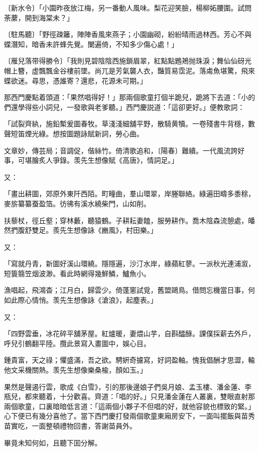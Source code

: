 \begin{myquote}
{\markfont〔新水令〕}「小園昨夜放江梅，另一番動人風味。梨花迎笑臉，楊柳妬腰圍。試問荼䕷，開到海棠未？」

{\markfont〔駐馬聽〕}「野徑疎籬，陣陣香風來燕子；小園幽砌，紛紛晴雨過林西。芳心不與蝶潛知，暗香未許蜂先覺。闌遍倚，不知多少傷心處！」

{\markfont〔雁兒落带得勝令〕}「我則見碧陰陰西施鎖眉翠，紅點點鶗鴂抛珠淚；舞仙仙砑光帽上簪，虚飄飄金谷樓前墜。尚兀是芳氣襲人衣，豔質易霑泥。落䖏魚堪驚，飛來蝶欲迷。尋思，憑誰寄？還悲，花源未可期。」
\end{myquote}

那西門慶點着頭道：「果然唱得好！」那兩個歌童打個半跪兒，跪將下去道：「小的們還學得些小詞兒，一發歌與老爹聽。」西門慶説道：「這卻更好。」便教歌詞：

\begin{myquote}
「試裂齊紈，施鉛槧爰圖春牧。草淺淺細舖平野，散騎黄犢。一卷殘書牛背穩，數聲短笛煙光綠。想按圖題詠賦新詞，勞心曲。

文章妙，傳芸局；音調促，偕絲竹。倚清歌追和，〔陽春〕難續。一代風流誇好事，可堪膾炙人爭錄。羡先生想像賦《高唐》，情詞足。」
\end{myquote}

又：

\begin{myquote}
「畫出耕圖，郊原外東阡西陌。町疃曲，羣山環翠，岸塍聯絡。綠遍田疇多黍稌，麥旂纂纂蚕盈箔。彷彿有溪水繞柴門，山如削。

扶藜杖，徑丘壑；穿林藪，聽猿鶴。子耕耘妻饁，服勞耕作。喬木陰森流憩處，皤然捫腹舒雙足。羨先生想像詠《豳風》，村田樂。」
\end{myquote}

又：

\begin{myquote}
「寫就丹青，新圖好溪山環繞。隱隱遍，沙汀水岸，綠蘋紅蓼。一派秋光連浦溆，短簑篛笠烟波渺。看此時網得幾鮮鱗，鱸魚小。

漁唱起，飛鴻杳；江月白，歸雲少。倚蓬窻試覓，舊盟鷗鳥。借問忘機當日事，何如此際心情悄。羡先生想像詠《滄浪》，起塵表。」
\end{myquote}

又：

\begin{myquote}
「四野雲垂，冰花碎平舖茅屋。紅爐暖，妻煨山芋，自斟醽醁。課僕採薪去外戶，呼兒引鶴翻平陸。攬此景寫入畫圖中，娛心目。

鍾貴富，天之祿；懼盛滿，吾之欲。騁姸奇攄寫，好詞盈軸。愧我倡酬才思澀，輸他文采機關熱。羡先生想像樂桑楡，顏如玉。」
\end{myquote}

果然是聲遏行雲，歌成《白雪》，引的那後邊娘子們吳月娘、孟玉樓、潘金蓮、李瓶兒，都來聽着，十分歡喜。齊道：「唱的好。」只見潘金蓮在人叢裏，雙眼直射那兩個歌童，口裏暗暗低言道：「這兩個小夥子不但唱的好，就他容貌也標致的緊。」心下便已有幾分喜他了。當下西門慶打發兩個歌童東廂房安下，一面叫擺飯與苗秀苗實吃，一面整頓禮物回書，答謝苗員外。

畢竟未知何如，且聽下囬分解。

